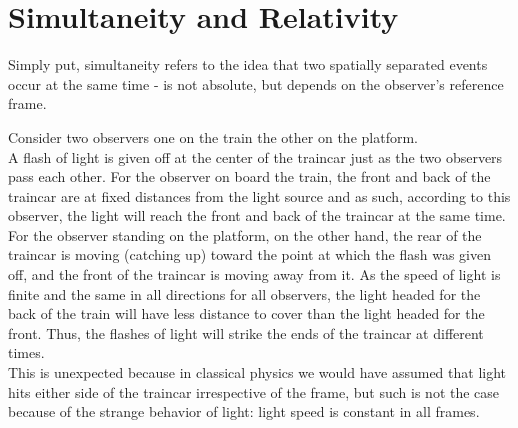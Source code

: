 \section{Simultaneity and Relativity}
Simply put, simultaneity refers to the idea that two spatially separated events occur at the same time - is not absolute, but depends on the observer's reference frame. 
\begin{example}
	Consider two observers one on the train the other on the platform. \\ 
	A flash of light is given off at the center of the traincar just as the two observers pass each other. For the observer on board the train, the front and back of the traincar are at fixed distances from the light source and as such, according to this observer, the light will reach the front and back of the traincar at the same time. \\
	For the observer standing on the platform, on the other hand, the rear of the traincar is moving (catching up) toward the point at which the flash was given off, and the front of the traincar is moving away from it. As the speed of light is finite and the same in all directions for all observers, the light headed for the back of the train will have less distance to cover than the light headed for the front. Thus, the flashes of light will strike the ends of the traincar at different times. \\
	This is unexpected because in classical physics we would have assumed that light hits either side of the traincar irrespective of the frame, but such is not the case because of the strange behavior of light: light speed is constant in all frames. 
\end{example}
